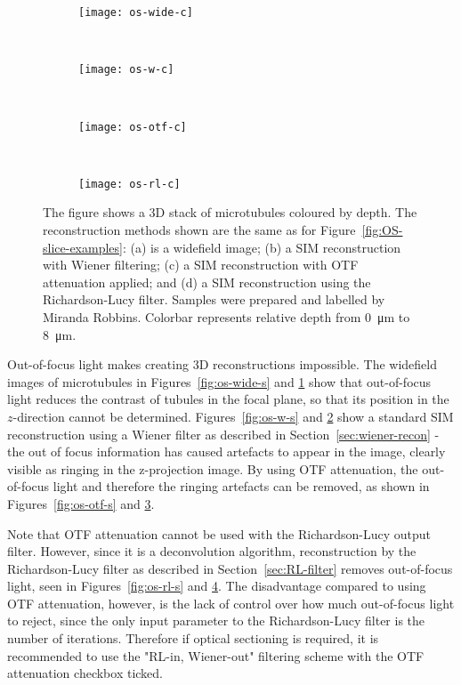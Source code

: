 \begin{figure}[tbp]
\vspace{-6pt} \centering
\begin{subfigure}[b]{0.49\textwidth}
	\texttt{[image: os-wide-c]}
	\caption{}\label{fig:os-wide-c}
\end{subfigure}
~
\begin{subfigure}[b]{0.49\textwidth}
	\texttt{[image: os-w-c]}
	\caption{}\label{fig:os-w-c}
\end{subfigure}
~\newline
\begin{subfigure}[b]{0.49\textwidth}
	\texttt{[image: os-otf-c]}
	\caption{}\label{fig:os-otf-c}
\end{subfigure}
~
\begin{subfigure}[b]{0.49\textwidth}
	\texttt{[image: os-rl-c]}
	\caption{}\label{fig:os-rl-c}
\end{subfigure}
\caption[LAG SIM: Removing out-of-focus reveals 3D structure]{The figure shows a 3D stack of microtubules coloured by depth. The reconstruction methods shown are the same as for Figure~\ref{fig:OS-slice-examples}: (a) is a widefield image; (b) a SIM reconstruction with Wiener filtering; (c) a SIM reconstruction with OTF attenuation applied; and (d) a SIM reconstruction using the Richardson-Lucy filter. Samples were prepared and labelled by Miranda Robbins. Colorbar represents relative depth from \SI{0}{\micro\metre} to \SI{8}{\micro\metre}.}
\label{fig:OS-colored-examples}
\end{figure}


Out-of-focus light makes creating 3D reconstructions impossible. 
The widefield images of microtubules in Figures~\ref{fig:os-wide-s} and \ref{fig:os-wide-c} show that out-of-focus light reduces the contrast of tubules in the focal plane, so that its position in the $z$-direction cannot be determined. Figures~\ref{fig:os-w-s} and \ref{fig:os-w-c} show a standard SIM reconstruction using a Wiener filter as described in Section~\ref{sec:wiener-recon} - the out of focus information has caused artefacts to appear in the image, clearly visible as ringing in the z-projection image. By using OTF attenuation, the out-of-focus light and therefore the ringing artefacts can be removed, as shown in Figures~\ref{fig:os-otf-s} and \ref{fig:os-otf-c}. 

Note that OTF attenuation cannot be used with the Richardson-Lucy output filter.
However, since it is a deconvolution algorithm, reconstruction by the Richardson-Lucy filter as described in Section~\ref{sec:RL-filter} removes out-of-focus light, seen in Figures~\ref{fig:os-rl-s} and \ref{fig:os-rl-c}.
The disadvantage compared to using OTF attenuation, however, is the lack of control over how much out-of-focus light to reject, since the only input parameter to the Richardson-Lucy filter is the number of iterations.
Therefore if optical sectioning is required, it is recommended to use the "RL-in, Wiener-out" filtering scheme with the OTF attenuation checkbox ticked.

